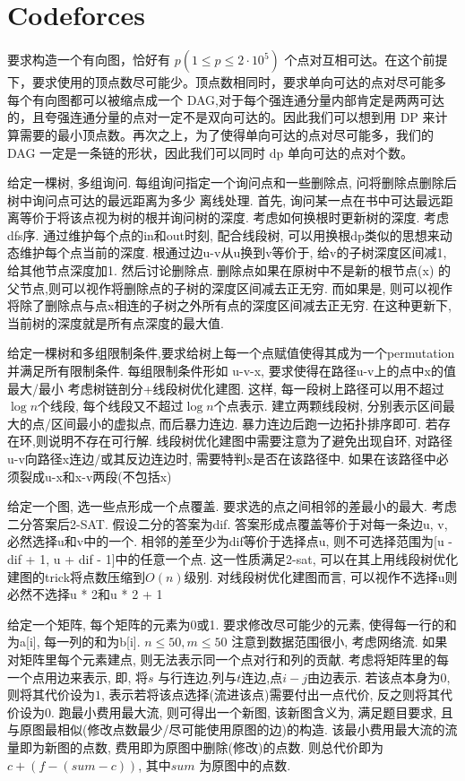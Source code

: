 \section{Codeforces}

\prob 要求构造一个有向图，恰好有 $p (1 \leq p \leq 2 \cdot 10^5)$ 个点对互相可达。在这个前提下，要求使用的顶点数尽可能少。顶点数相同时，要求单向可达的点对尽可能多
\sol 每个有向图都可以被缩点成一个 DAG,对于每个强连通分量内部肯定是两两可达的，且夸强连通分量的点对一定不是双向可达的。因此我们可以想到用 DP 来计算需要的最小顶点数。再次之上，为了使得单向可达的点对尽可能多，我们的 DAG 一定是一条链的形状，因此我们可以同时 dp 单向可达的点对个数。

\prob 给定一棵树, 多组询问. 每组询问指定一个询问点和一些删除点, 问将删除点删除后树中询问点可达的最远距离为多少
\sol 离线处理. 首先, 询问某一点在书中可达最远距离等价于将该点视为树的根并询问树的深度. 考虑如何换根时更新树的深度. 考虑dfs序. 通过维护每个点的in和out时刻, 配合线段树, 可以用换根dp类似的思想来动态维护每个点当前的深度. 根通过边u-v从u换到v等价于, 给v的子树深度区间减1, 给其他节点深度加1. 然后讨论删除点. 删除点如果在原树中不是新的根节点(x) 的父节点,则可以视作将删除点的子树的深度区间减去正无穷. 而如果是, 则可以视作将除了删除点与点x相连的子树之外所有点的深度区间减去正无穷. 在这种更新下, 当前树的深度就是所有点深度的最大值.

\prob 给定一棵树和多组限制条件,要求给树上每一个点赋值使得其成为一个permutation并满足所有限制条件. 每组限制条件形如 u-v-x, 要求使得在路径u-v上的点中x的值最大/最小
\sol 考虑树链剖分+线段树优化建图. 这样, 每一段树上路径可以用不超过$\log{n}$个线段, 每个线段又不超过$\log{n}$个点表示. 建立两颗线段树, 分别表示区间最大的点/区间最小的虚拟点, 而后暴力连边. 暴力连边后跑一边拓扑排序即可. 若存在环,则说明不存在可行解. 线段树优化建图中需要注意为了避免出现自环, 对路径u-v向路径x连边/或其反边连边时, 需要特判x是否在该路径中. 如果在该路径中必须裂成u-x和x-v两段(不包括x)

\prob 给定一个图, 选一些点形成一个点覆盖. 要求选的点之间相邻的差最小的最大.
\sol 考虑二分答案后2-SAT. 假设二分的答案为dif. 答案形成点覆盖等价于对每一条边u, v, 必然选择u和v中的一个. 相邻的差至少为dif等价于选择点u, 则不可选择范围为[u - dif + 1, u + dif - 1]中的任意一个点. 这一性质满足2-sat, 可以在其上用线段树优化建图的trick将点数压缩到$O(n)$级别. 对线段树优化建图而言, 可以视作不选择u则必然不选择u * 2和u * 2 + 1

\prob 给定一个矩阵, 每个矩阵的元素为0或1. 要求修改尽可能少的元素, 使得每一行的和为a[i], 每一列的和为b[i]. $n \leq 50, m \leq 50$
\sol 注意到数据范围很小, 考虑网络流. 如果对矩阵里每个元素建点, 则无法表示同一个点对行和列的贡献. 考虑将矩阵里的每一个点用边来表示, 即, 将$s$ 与行连边,列与$t$连边,点$i-j$由边表示. 若该点本身为$0$, 则将其代价设为$1$, 表示若将该点选择(流进该点)需要付出一点代价, 反之则将其代价设为$0$. 跑最小费用最大流, 则可得出一个新图, 该新图含义为, 满足题目要求, 且与原图最相似(修改点数最少/尽可能使用原图的边)的构造. 该最小费用最大流的流量即为新图的点数, 费用即为原图中删除(修改)的点数. 则总代价即为 $c + (f - (sum - c))$, 其中$sum$ 为原图中的点数.

